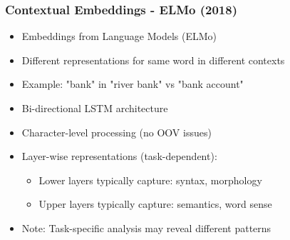 


\begin{frame}[fragile]\frametitle{Contextual Embeddings - ELMo (2018)}
\begin{itemize}
\item Embeddings from Language Models (ELMo)
\item Different representations for same word in different contexts
\item Example: "bank" in "river bank" vs "bank account"
\item Bi-directional LSTM architecture
\item Character-level processing (no OOV issues)
\item Layer-wise representations (task-dependent):
  \begin{itemize}
  \item Lower layers typically capture: syntax, morphology
  \item Upper layers typically capture: semantics, word sense
  \end{itemize}
\item Note: Task-specific analysis may reveal different patterns
\end{itemize}
\end{frame}


